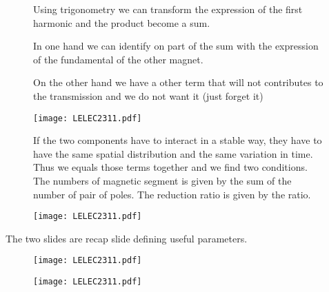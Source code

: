 \begin{figure}[H]
    \begin{minipage}{.45\linewidth}
        Using trigonometry we can transform the expression of the first harmonic and the product become a sum.
        
        In one hand we can identify on part of the sum with the expression of the fundamental of the other magnet.
        
        On the other hand we have a other term that will not contributes to the transmission and we do not want it (just forget it) 
    \end{minipage}
    \hfill%
    \begin{minipage}[c]{.45\linewidth}
        \centering
        \texttt{[image: LELEC2311.pdf]}
    \end{minipage}
\end{figure}

\begin{figure}[H]
    \begin{minipage}{.45\linewidth}
        If the two components have to interact in a stable way, they have to have the same spatial distribution and the same variation in time. Thus we equals those terms together and we find two conditions. The numbers of magnetic segment is given by the sum of the number of pair of poles. The reduction ratio is given by the ratio.
    \end{minipage}
    \hfill%
    \begin{minipage}[c]{.45\linewidth}
        \centering
        \texttt{[image: LELEC2311.pdf]}
    \end{minipage}
\end{figure}

  The two slides are recap slide defining useful parameters. 
\begin{figure}[H]
    \begin{minipage}{.45\linewidth}
       \texttt{[image: LELEC2311.pdf]}
    \end{minipage}
    \hfill%
    \begin{minipage}[c]{.45\linewidth}
        \centering
        \texttt{[image: LELEC2311.pdf]}
    \end{minipage}
\end{figure}

